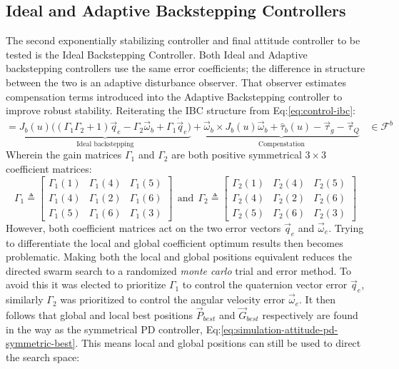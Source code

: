 \subsection{Ideal and Adaptive Backstepping Controllers}
The second exponentially stabilizing controller and final attitude controller to be tested is the Ideal Backstepping Controller. Both Ideal and Adaptive backstepping controllers use the same error coefficients; the difference in structure between the two is an adaptive disturbance observer. That observer estimates compensation terms introduced into the Adaptive Backstepping controller to improve robust stability. Reiterating the IBC structure from Eq:\ref{eq:control-ibc}:
\begin{equation}\label{eq:simulation-attitude-ibc}
=\underbrace{J_b(u)\Big((\Gamma_1\Gamma_2+1)\vec{q}_e-\Gamma_2\vec{\omega}_b+\Gamma_1\dot{\vec{q}}_e \Big)}_{\text{Ideal backstepping}}
+\underbrace{\vec{\omega}_b\times J_b(u)\vec{\omega}_b+\hat{\tau}_b(u)-\vec{\tau}_g-\vec{\tau}_Q}_{\text{Compenstation}}~~~~\in\mathcal{F}^{b}
\end{equation}
Wherein the gain matrices $\Gamma_1$ and $\Gamma_2$ are both positive symmetrical $3\times 3$ coefficient matrices:
\begin{equation}\label{eq:simulation-attitde-ibc-coefficients}
\Gamma_1\triangleq \begin{bmatrix}
\Gamma_1(1) & \Gamma_1(4) & \Gamma_1(5)\\
\Gamma_1(4) & \Gamma_1(2) & \Gamma_1(6)\\
\Gamma_1(5) & \Gamma_1(6) & \Gamma_1(3)
\end{bmatrix}
~~\text{and}~~
\Gamma_2\triangleq \begin{bmatrix}
\Gamma_2(1) & \Gamma_2(4) & \Gamma_2(5)\\
\Gamma_2(4) & \Gamma_2(2) & \Gamma_2(6)\\
\Gamma_2(5) & \Gamma_2(6) & \Gamma_2(3)
\end{bmatrix}
\end{equation}
However, both coefficient matrices act on the two error vectors $\vec{q}_e$ and $\vec{\omega}_e$. Trying to differentiate the local and global coefficient optimum results then becomes problematic. Making both the local and global positions equivalent reduces the directed swarm search to a randomized \emph{monte carlo} trial and error method. To avoid this it was elected to prioritize $\Gamma_1$ to control the quaternion vector error $\vec{q}_e$, similarly $\Gamma_2$ was prioritized to control the angular velocity error $\vec{\omega}_e$. It then follows that global and local best positions $\vec{P}_{best}$ and $\vec{G}_{best}$ respectively are found in the way as the symmetrical PD controller, Eq:\ref{eq:simulation-attitude-pd-symmetric-best}. This means local and global positions can still be used to direct the search space:
